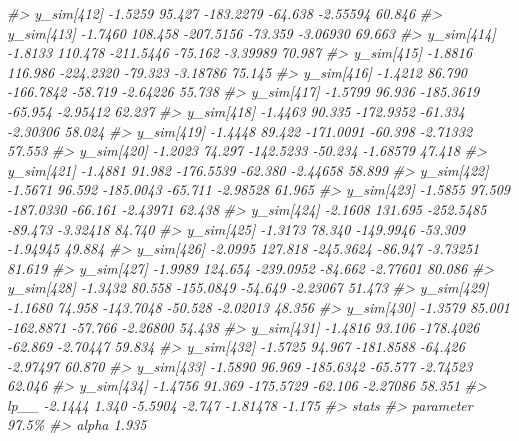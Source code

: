 \documentclass[
  10pt,
  italian,
  a4paper,
  extrafontsizes,onecolumn,openright
  ]{memoir}
\newenvironment{Shaded}{\begin{snugshade}}{\end{snugshade}}
\newcommand{\CommentTok}[1]{\textcolor[rgb]{0.56,0.35,0.01}{\textit{#1}}}
\begin{document}
\begin{Shaded}
\begin{Highlighting}[]
\CommentTok{\#\textgreater{}   y\_sim[412] {-}1.5259  95.427 {-}183.2279 {-}64.638 {-}2.55594 60.846}
\CommentTok{\#\textgreater{}   y\_sim[413] {-}1.7460 108.458 {-}207.5156 {-}73.359 {-}3.06930 69.663}
\CommentTok{\#\textgreater{}   y\_sim[414] {-}1.8133 110.478 {-}211.5446 {-}75.162 {-}3.39989 70.987}
\CommentTok{\#\textgreater{}   y\_sim[415] {-}1.8816 116.986 {-}224.2320 {-}79.323 {-}3.18786 75.145}
\CommentTok{\#\textgreater{}   y\_sim[416] {-}1.4212  86.790 {-}166.7842 {-}58.719 {-}2.64226 55.738}
\CommentTok{\#\textgreater{}   y\_sim[417] {-}1.5799  96.936 {-}185.3619 {-}65.954 {-}2.95412 62.237}
\CommentTok{\#\textgreater{}   y\_sim[418] {-}1.4463  90.335 {-}172.9352 {-}61.334 {-}2.30306 58.024}
\CommentTok{\#\textgreater{}   y\_sim[419] {-}1.4448  89.422 {-}171.0091 {-}60.398 {-}2.71332 57.553}
\CommentTok{\#\textgreater{}   y\_sim[420] {-}1.2023  74.297 {-}142.5233 {-}50.234 {-}1.68579 47.418}
\CommentTok{\#\textgreater{}   y\_sim[421] {-}1.4881  91.982 {-}176.5539 {-}62.380 {-}2.44658 58.899}
\CommentTok{\#\textgreater{}   y\_sim[422] {-}1.5671  96.592 {-}185.0043 {-}65.711 {-}2.98528 61.965}
\CommentTok{\#\textgreater{}   y\_sim[423] {-}1.5855  97.509 {-}187.0330 {-}66.161 {-}2.43971 62.438}
\CommentTok{\#\textgreater{}   y\_sim[424] {-}2.1608 131.695 {-}252.5485 {-}89.473 {-}3.32418 84.740}
\CommentTok{\#\textgreater{}   y\_sim[425] {-}1.3173  78.340 {-}149.9946 {-}53.309 {-}1.94945 49.884}
\CommentTok{\#\textgreater{}   y\_sim[426] {-}2.0995 127.818 {-}245.3624 {-}86.947 {-}3.73251 81.619}
\CommentTok{\#\textgreater{}   y\_sim[427] {-}1.9989 124.654 {-}239.0952 {-}84.662 {-}2.77601 80.086}
\CommentTok{\#\textgreater{}   y\_sim[428] {-}1.3432  80.558 {-}155.0849 {-}54.649 {-}2.23067 51.473}
\CommentTok{\#\textgreater{}   y\_sim[429] {-}1.1680  74.958 {-}143.7048 {-}50.528 {-}2.02013 48.356}
\CommentTok{\#\textgreater{}   y\_sim[430] {-}1.3579  85.001 {-}162.8871 {-}57.766 {-}2.26800 54.438}
\CommentTok{\#\textgreater{}   y\_sim[431] {-}1.4816  93.106 {-}178.4026 {-}62.869 {-}2.70447 59.834}
\CommentTok{\#\textgreater{}   y\_sim[432] {-}1.5725  94.967 {-}181.8588 {-}64.426 {-}2.97497 60.870}
\CommentTok{\#\textgreater{}   y\_sim[433] {-}1.5890  96.969 {-}185.6342 {-}65.577 {-}2.74523 62.046}
\CommentTok{\#\textgreater{}   y\_sim[434] {-}1.4756  91.369 {-}175.5729 {-}62.106 {-}2.27086 58.351}
\CommentTok{\#\textgreater{}   lp\_\_       {-}2.1444   1.340   {-}5.5904  {-}2.747 {-}1.81478 {-}1.175}
\CommentTok{\#\textgreater{}             stats}
\CommentTok{\#\textgreater{} parameter      97.5\%}
\CommentTok{\#\textgreater{}   alpha        1.935}

\end{Highlighting}
\end{Shaded}
\end{document}
